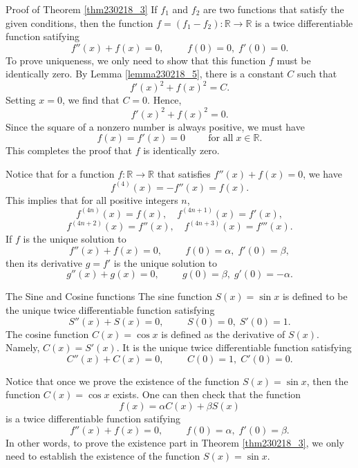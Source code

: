 \begin{myproof}{\linkt   Proof of Theorem \ref{thm230218_3}}
If $f_1$ and $f_2$ are two functions that satisfy the given conditions, then the function $f=(f_1-f_2):\mathbb{R}\to\mathbb{R}$ is a  twice   differentiable function
satifying
\[f''(x)+f(x)=0,\hspace{1cm}f(0)=0,\; f'(0)=0.\]
To prove uniqueness, we only need to show that this function $f$ must be identically zero. 
By Lemma \ref{lemma230218_5}, there is a constant $C$ such that 
\[f'(x)^2+f(x)^2=C.\]
Setting $x=0$, we find that $C=0$. Hence,
\[f'(x)^2+f(x)^2=0.\]\bp
Since the square of a nonzero number is always positive, we must have
\[f(x)=f'(x)=0\hspace{1cm}\text{for all}\;x\in \mathbb{R}.\]
This completes the proof that $f$ is identically zero.

\end{myproof}
Notice that for a function $f:\mathbb{R}\to\mathbb{R}$ that satisfies $f''(x)+f(x)=0$, we have
\[f^{(4)}(x)=-f''(x)=f(x).\]
This implies that for all positive integers $n$,
\[f^{(4n)}(x)=f(x),\quad f^{(4n+1)}(x)=f'(x),\]
\[f^{(4n+2)}(x)=f''(x),\quad f^{(4n+3)}(x)=f'''(x).\]If $f$ is the unique solution to \[f''(x)+f(x)=0,\hspace{1cm}f(0)=\alpha,\; f'(0)=\beta,\] then its derivative $g=f'$ is the unique solution to
\[g''(x)+g(x)=0,\hspace{1cm}g(0)=\beta,\; g'(0)=-\alpha.\]

\begin{definition}{The Sine and Cosine functions}
The sine function $S(x)=\sin x$ is defined to be   the unique twice   differentiable function satisfying
\[S''(x)+S(x)=0,\hspace{1cm}S(0)=0,\;S'(0)=1.\]The cosine function $C(x)=\cos x$ is defined as the derivative of $S(x)$. Namely, 
$C(x)=S'(x)$. It is the unique twice differentiable function satisfying
\[C''(x)+C(x)=0, \hspace{1cm}C(0)=1,\;C'(0)=0.\]
\end{definition}


Notice that once we prove the existence of the function $S(x)=\sin x$, then the function $C(x)=\cos x$ exists. One can then check that the function
\[f(x)=\alpha C(x)+\beta S(x)\] is a twice differentiable function satifying \[f''(x)+f(x)=0,\hspace{1cm}f(0)=\alpha,\;f'(0)=\beta.\]In other words, to prove the existence part in Theorem 
\ref{thm230218_3}, we only need to establish the existence of the function $S(x)=\sin x$.


